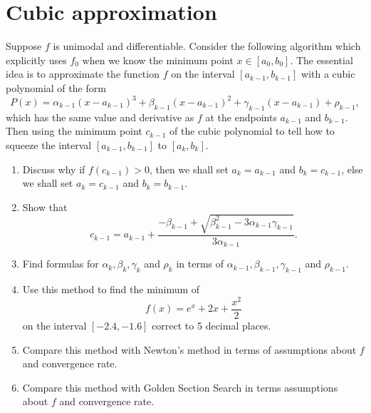 \section{Cubic approximation}
Suppose \(f\) is unimodal and differentiable.
Consider the following algorithm which explicitly uses \(f_0\) when we know the minimum point \(x\in[a_0, b_0]\).
The essential idea is to approximate the function \(f\) on the interval \([a_{k-1}, b_{k-1}]\) with a cubic polynomial of the form
\[ P(x)=\alpha_{k-1}(x-a_{k-1})^3+\beta_{k-1}(x-a_{k-1})^2 + \gamma_{k-1}(x-a_{k-1})+\rho_{k-1}, \]
which has the same value and derivative as \(f\) at the endpoints \(a_{k-1}\) and \(b_{k-1}\).
Then using the minimum point \(c_{k-1}\) of the cubic polynomial to tell how to squeeze the interval \([a_{k-1}, b_{k-1}]\) to \([a_k, b_k]\).
\begin{enumerate}
	\item Discuss why if \(f(c_{k-1})>0\), then we shall set \(a_k=a_{k-1}\) and \(b_k=c_{k-1}\), else we shall set \(a_k=c_{k-1}\) and \(b_k=b_{k-1}\).
	\item Show that
	\[ c_{k-1}=a_{k-1}+\frac{-\beta_{k-1}+\sqrt{\beta_{k-1}^2-3\alpha_{k-1}\gamma_{k-1}}}{3\alpha_{k-1}}. \]
	\item Find formulas for \(\alpha_{k}, \beta_{k}, \gamma_{k}\) and \(\rho_k\) in terms of  \(\alpha_{k-1}, \beta_{k-1}, \gamma_{k-1}\) and \(\rho_{k-1}\).
	\item Use this method to find the minimum of
	\[ f(x)=e^x+2x+\frac{x^2}{2} \]
	on the interval \([-2.4, -1.6]\) correct to 5 decimal places.
	\item Compare this method with Newton's method in terms of assumptions about \(f\) and convergence rate.
	\item Compare this method with Golden Section Search in terms assumptions about \(f\) and convergence rate.
\end{enumerate}



